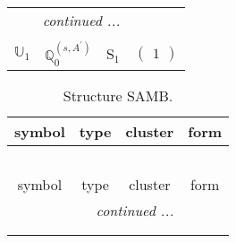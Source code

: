 \documentclass[fleqn,10pt,landscape]{article}
\begin{document}
\begin{itemize}
\begin{center}
\begin{longtable}{c|c|c|c}
 \hline \hline
\multicolumn{3}{r}{\footnotesize\it continued ...} \\ \endfoot

 \hline \hline
\multicolumn{3}{r}{} \\ \endlastfoot

$ \mathbb{U}_{1} $ & $\mathbb{Q}_{0}^{(s,A^{\prime})}$ & S$_{1}$ & $\begin{pmatrix} 1 \end{pmatrix}$ \\
\end{longtable}
\end{center}
\begin{center}
\renewcommand{\arraystretch}{1.3}
\begin{longtable}{c|c|c|c}
\caption{Structure SAMB.}
 \\
 \hline \hline
symbol & type & cluster & form \\ \hline \endfirsthead

\multicolumn{3}{l}{\tablename\ \thetable{}} \\
 \hline \hline
symbol & type & cluster & form \\ \hline \endhead

 \hline \hline
\multicolumn{3}{r}{\footnotesize\it continued ...} \\ \endfoot

 \hline \hline
\multicolumn{3}{r}{} \\ \endlastfoot


\end{longtable}
\end{center}
\end{itemize}
\end{document}
